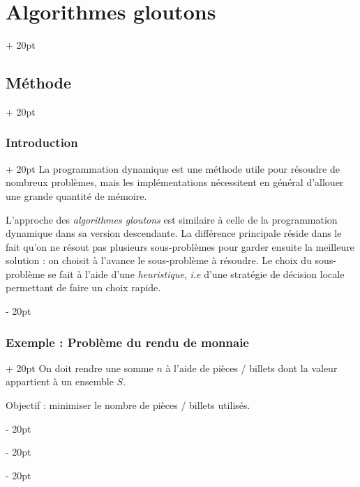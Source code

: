 \documentclass[a4paper, 12pt, twoside]{article}
\newcommand{\ind}[1][20pt]{\advance\leftskip + #1}
\newcommand{\deind}[1][20pt]{\advance\leftskip - #1}
\newenvironment{indt}[2][20pt]{#2 \par \ind[#1]}{\par \deind} %
\begin{document}
    \vspace{12pt}
    
    \begin{indt}{\section{Algorithmes gloutons}}
        
        \label{4}
        
        \begin{indt}{\subsection{Méthode}}
            \begin{indt}{\subsubsection{Introduction}}
                La programmation dynamique est une méthode utile pour résoudre de nombreux problèmes, mais les implémentations nécessitent en général d'allouer une grande quantité de mémoire.
                
                L'approche des \textit{algorithmes gloutons} est similaire à celle de la programmation dynamique dans sa version descendante.
                La différence principale réside dans le fait qu'on ne résout pas plusieurs sous-problèmes pour garder ensuite la meilleure solution : on choisit à l'avance le sous-problème à résoudre.
                Le choix du sous-problème se fait à l'aide d'une \textit{heuristique}, \textit{i.e} d'une stratégie de décision locale permettant de faire un choix rapide.
            \end{indt}
            
            \vspace{12pt}
            
            \begin{indt}{\subsubsection{Exemple : Problème du rendu de monnaie}}
                On doit rendre une somme $n$ à l'aide de pièces / billets dont la valeur appartient à un ensemble $S$.
                
                Objectif : minimiser le nombre de pièces / billets utilisés.
                
                \vspace{12pt}
                

\end{indt}
\end{indt}
\end{indt}
\end{document}
